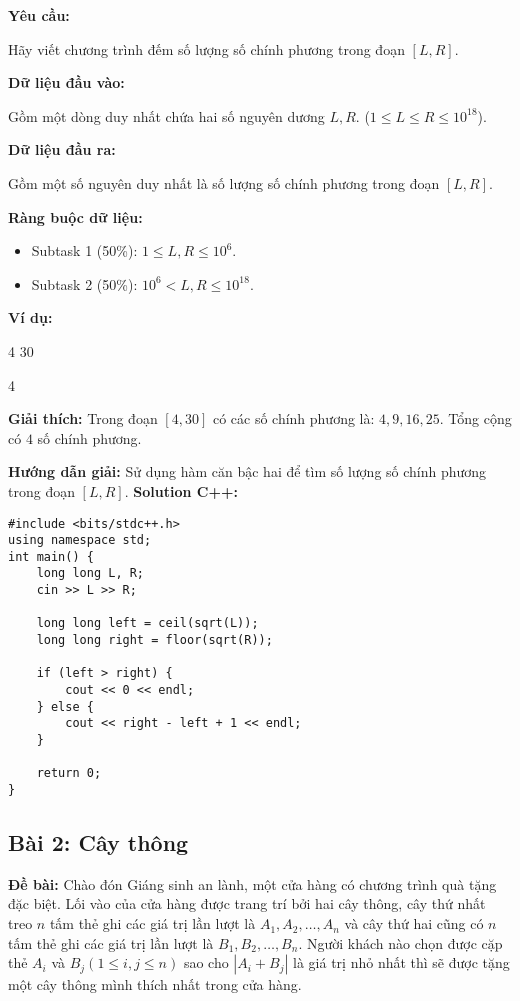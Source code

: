 \documentclass[12pt]{scrartcl}  %
\begin{document}
\textbf{Yêu cầu:}

Hãy viết chương trình đếm số lượng số chính phương trong đoạn $[L, R]$.

\textbf{Dữ liệu đầu vào:}

Gồm một dòng duy nhất chứa hai số nguyên dương $L, R$. ($1 \leq L \leq R \leq 10^{18}$).

\textbf{Dữ liệu đầu ra:}

Gồm một số nguyên duy nhất là số lượng số chính phương trong đoạn $[L, R]$.

\textbf{Ràng buộc dữ liệu:}

\begin{itemize}
    \item Subtask 1 (50\%): $1 \leq L, R \leq 10^6$.
    \item Subtask 2 (50\%): $10^6 < L, R \leq 10^{18}$.
\end{itemize}

\textbf{Ví dụ:}
\begin{tcolorbox}[colback=gray!5!white, colframe=blue!50!black, title=Input]
4 30
\end{tcolorbox}
\begin{tcolorbox}[colback=gray!5!white, colframe=green!50!black, title=Output]
4
\end{tcolorbox}

\textbf{Giải thích:}
Trong đoạn $[4, 30]$ có các số chính phương là: $4, 9, 16, 25$. Tổng cộng có $4$ số chính phương.

\textbf{Hướng dẫn giải:}
Sử dụng hàm căn bậc hai để tìm số lượng số chính phương trong đoạn $[L, R]$.
\textbf{Solution C++:}
\begin{lstlisting}
#include <bits/stdc++.h>
using namespace std;
int main() {
    long long L, R;
    cin >> L >> R;
    
    long long left = ceil(sqrt(L));
    long long right = floor(sqrt(R));
    
    if (left > right) {
        cout << 0 << endl;
    } else {
        cout << right - left + 1 << endl;
    }
    
    return 0;
}
\end{lstlisting}

\subsection{Bài 2: Cây thông}

\textbf{Đề bài:}
Chào đón Giáng sinh an lành, một cửa hàng có chương trình quà tặng đặc biệt. Lối vào của cửa hàng được trang trí bởi hai cây thông, cây thứ nhất treo $n$ tấm thẻ ghi các giá trị lần lượt là $A_1, A_2, \ldots, A_n$ và cây thứ hai cũng có $n$ tấm thẻ ghi các giá trị lần lượt là $B_1, B_2, \ldots, B_n$. Người khách nào chọn được cặp thẻ $A_i$ và $B_j (1 \leq i,j \leq n)$ sao cho $|A_i + B_j|$ là giá trị nhỏ nhất thì sẽ được tặng một cây thông mình thích nhất trong cửa hàng. 
\end{document}
